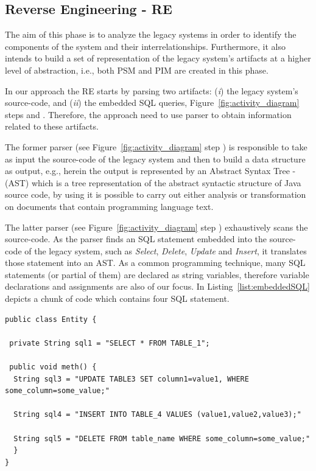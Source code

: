 \documentclass[a4paper,twoside]{article}
\newcommand*\circled[1]{\tikz[baseline=(char.base)]{
  \node[shape=circle,draw, inner sep=0.1pt] (char) {#1};}
}
\begin{document}
\subsection{Reverse Engineering - RE} 

The aim of this phase is to analyze the legacy systems in order to identify the components of the system and their interrelationships. Furthermore, it also intends to build a set of representation of the legacy system's artifacts at a higher level of abstraction, i.e., both PSM and PIM are created in this phase. 

In our approach the RE starts by parsing two artifacts: (\textit{i}) the legacy system's source-code, and (\textit{ii}) the embedded SQL queries, Figure~\ref{fig:activity_diagram} steps \circled{\textbf{A}} and \circled{\textbf{B}}. Therefore, the  approach need to use parser to obtain information related to these artifacts. 

The former parser (see Figure~\ref{fig:activity_diagram} step \circled{\textbf{A}}) is responsible to take as input the source-code of the legacy system and then to build a data structure as output, e.g., herein the output is represented by an Abstract Syntax Tree - (AST)  which is a tree representation of the abstract syntactic structure of Java source code, by using it is possible to carry out either analysis or transformation on documents that contain programming language text.


 The latter parser (see Figure~\ref{fig:activity_diagram} step \circled{\textbf{B}}) exhaustively scans the source-code. As the parser finds an SQL statement embedded into the source-code of the legacy system, such as \textit{Select}, \textit{Delete}, \textit{Update} and \textit{Insert}, it translates those statement into an AST. As a common programming technique, many SQL statements (or partial of them) are declared as string variables, therefore variable  declarations and assignments are also of our focus.
In Listing~\ref{list:embeddedSQL} depicts a chunk of code which contains four SQL statement. 

\begin{lstlisting}[caption=Example of Embedded SQL, label=list:embeddedSQL, frame=lrtb, basicstyle=\tiny]
public class Entity {

 private String sql1 = "SELECT * FROM TABLE_1";

 public void meth() {
  String sql3 = "UPDATE TABLE3 SET column1=value1, WHERE some_column=some_value;"
  
  String sql4 = "INSERT INTO TABLE_4 VALUES (value1,value2,value3);"
  
  String sql5 = "DELETE FROM table_name WHERE some_column=some_value;"
  }
}
\end{lstlisting}
\end{document}
